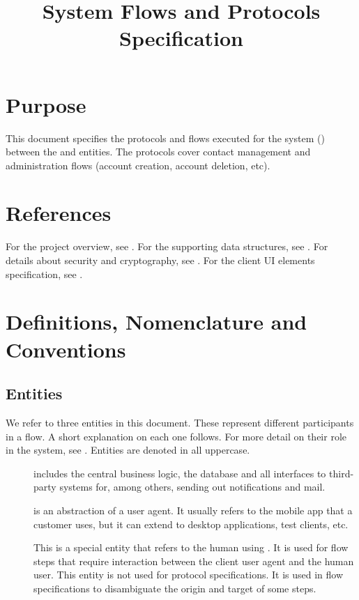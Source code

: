 \documentclass[a4paper,10pt,draft]{article}
\title{\longProduct{} System Flows and Protocols Specification}
\begin{document}
\maketitle
\tableofcontents

\section{Purpose}
This document specifies the protocols and flows executed for the \longProduct{} system (\shortProduct{}) between the \server{} and \client{} entities. The protocols cover contact 
management and administration flows (account creation, account deletion, etc).

\section{References}
For the project overview, see \cite{project_spec}. For the supporting data structures, see \cite{data_structure_spec}. For details about security and cryptography, 
see \cite{crypto_spec}. For the client UI elements specification, see \cite{UI_spec}.

\section{Definitions, Nomenclature and Conventions}

\subsection{Entities}
We refer to three entities in this document. These represent different participants in a flow. A short explanation on each one follows. For more detail on their role in the 
system, see \cite{project_spec}. Entities are denoted in all uppercase.

\begin{description}
 \item[\Server{}] includes the central business logic, the database and all interfaces to third-party systems for, among others, sending out notifications and mail.
 \item[\Client{}] is an abstraction of a user agent. It usually refers to the mobile app that a customer uses, but it can extend to desktop applications, test clients, etc.
 \item[\User{}] This is a special entity that refers to the human using \Client{}. It is used for flow steps that require interaction between the client user agent and the human 
user. This entity is not used for protocol specifications. It is used in flow specifications to disambiguate the origin and target of some steps.
\end{description}
\end{document}
